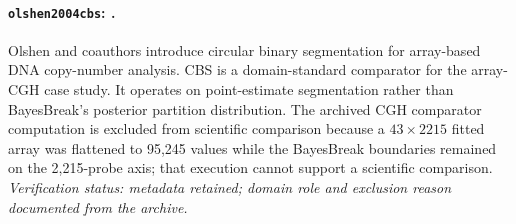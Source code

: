 
\paragraph{\texttt{olshen2004cbs}: \citet{olshen2004cbs}.}
Olshen and coauthors introduce circular binary segmentation for array-based DNA copy-number analysis. CBS is a domain-standard comparator for the array-CGH case study. It operates on point-estimate segmentation rather than BayesBreak's posterior partition distribution. The archived CGH comparator computation is excluded from scientific comparison because a $43\times2215$ fitted array was flattened to 95,245 values while the BayesBreak boundaries remained on the 2,215-probe axis; that execution cannot support a scientific comparison. \textit{Verification status: metadata retained; domain role and exclusion reason documented from the archive.}
